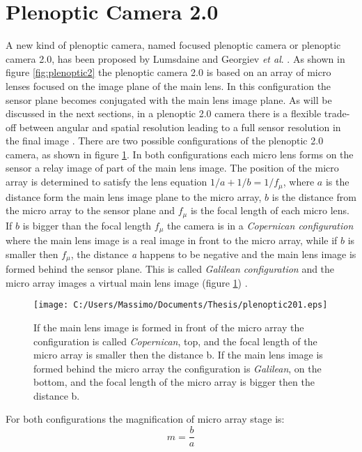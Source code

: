  \section{Plenoptic Camera 2.0}
 \label{sec:pleno20}
 A new kind of plenoptic camera, named focused plenoptic camera or plenoptic camera 2.0, has been proposed by Lumsdaine and Georgiev \textit{et al}. \cite{lumsdaine2008full,lumsdaine2009focused}. As shown in figure \ref{fig:plenoptic2} the plenoptic camera 2.0 is based on an array of micro lenses focused on the image plane of the main lens. In this configuration the sensor plane becomes conjugated with the main lens image plane. As will be discussed in the next sections, in a plenoptic 2.0 camera there is a flexible trade-off between angular and spatial resolution \cite{georgiev2010focused} leading to a full sensor resolution in the final image \cite{bishop2011full,georgiev2009resolution}. There are two possible configurations of the plenoptic 2.0 camera, as shown in figure \ref{fig:pleno201}. In both configurations each micro lens forms on the sensor a relay image of part of the main lens image. The position of the micro array is determined to satisfy the lens equation $1/a+1/b=1/f_{\mu}$, where $a$ is the distance form the main lens image plane to the micro array, $b$ is the distance from the micro array to the sensor plane and $f_{\mu}$ is the focal length of each micro lens. If $b$ is bigger than the focal length $f_{\mu}$ the camera is in a \textit{Copernican configuration} where the main lens image is a real image in front to the micro array, while if $b$ is smaller then $f_{\mu}$, the distance \textit{a} happens to be negative and the main lens image is formed behind the sensor plane. This is called \textit{Galilean configuration} and the micro array images a virtual main lens image (figure \ref{fig:pleno201}) \cite{georgiev2010focused}. 
 \begin{figure}[H]
 	\centering
 	\texttt{[image: C:/Users/Massimo/Documents/Thesis/plenoptic201.eps]}
 	\caption{\label{fig:pleno201} If the main lens image is formed in front of the micro array the configuration is called \textit{Copernican}, top, and the focal length of the micro array is smaller then the distance b. If the main lens image is formed behind the micro array the configuration is \textit{Galilean}, on the bottom, and the focal length of the micro array is bigger then the distance b. }
 \end{figure}
 For both configurations the magnification of micro array stage is:
 \begin{equation}
 \label{eq:pleno20}
 m=\dfrac{b}{a}
 \end{equation}
